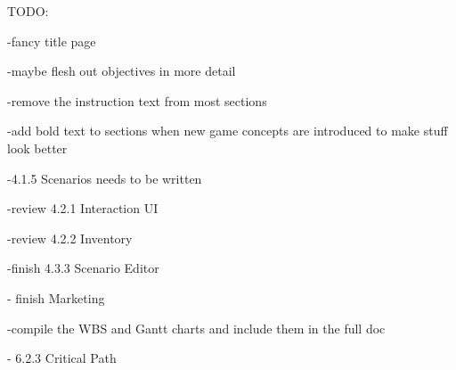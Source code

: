 TODO:

-fancy title page

-maybe flesh out objectives in more detail

-remove the instruction text from most sections

-add bold text to sections when new game concepts are introduced to make stuff look better

-4.1.5 Scenarios needs to be written

-review 4.2.1 Interaction UI

-review 4.2.2 Inventory

-finish 4.3.3 Scenario Editor

- finish Marketing

-compile the WBS and Gantt charts and include them in the full doc

- 6.2.3 Critical Path